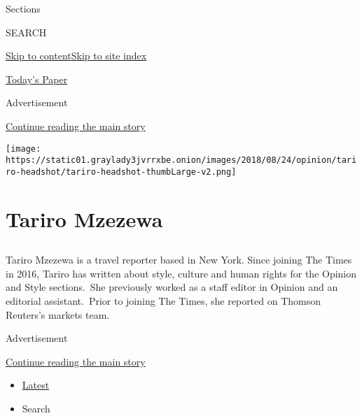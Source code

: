 Sections

SEARCH

\protect\hyperlink{site-content}{Skip to
content}\protect\hyperlink{site-index}{Skip to site index}

\href{https://myaccount.nytimes3xbfgragh.onion/auth/login?response_type=cookie\&client_id=vi}{}

\href{https://www.nytimes3xbfgragh.onion/section/todayspaper}{Today's
Paper}

Advertisement

\protect\hyperlink{after-top}{Continue reading the main story}

\texttt{[image: https://static01.graylady3jvrrxbe.onion/images/2018/08/24/opinion/tariro-headshot/tariro-headshot-thumbLarge-v2.png]}

\hypertarget{tariro-mzezewa}{%
\section{Tariro Mzezewa}\label{tariro-mzezewa}}

\subsection{}

Tariro Mzezewa is a travel reporter based in New York. Since joining The
Times in 2016, Tariro has written about style, culture and human rights
for the Opinion and Style sections.~She previously worked as a staff
editor in Opinion and an editorial assistant.~Prior to joining The
Times, she reported on Thomson Reuters's markets team.~

Advertisement

\protect\hyperlink{after-mid1}{Continue reading the main story}

\begin{itemize}
\tightlist
\item
  \protect\hyperlink{stream-panel}{Latest}
\item
  Search
\end{itemize}

